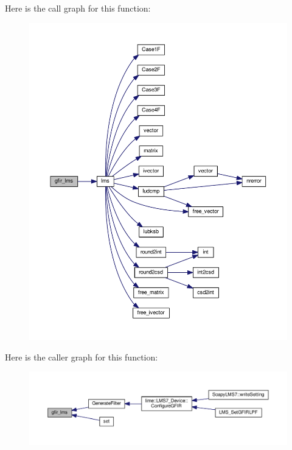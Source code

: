 Here is the call graph for this function\+:
\nopagebreak
\begin{figure}[H]
\begin{center}
\leavevmode
\includegraphics[width=350pt]{d7/db9/gfir__lms_8c_ac38901ce1a77268e51f4c4e2a776c849_cgraph}
\end{center}
\end{figure}




Here is the caller graph for this function\+:
\nopagebreak
\begin{figure}[H]
\begin{center}
\leavevmode
\includegraphics[width=350pt]{d7/db9/gfir__lms_8c_ac38901ce1a77268e51f4c4e2a776c849_icgraph}
\end{center}
\end{figure}


